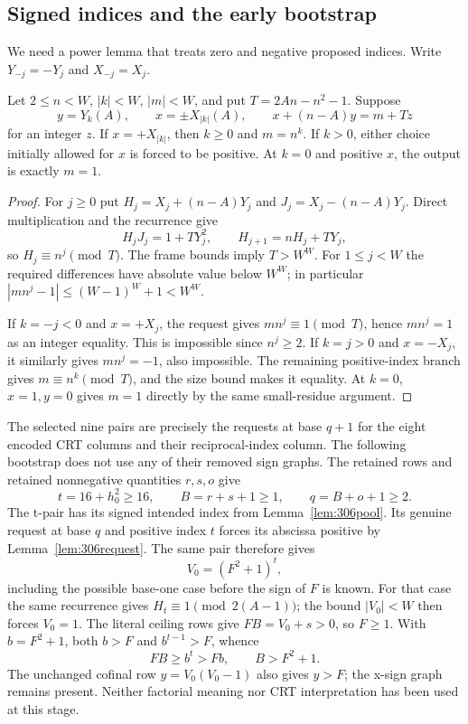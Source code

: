 \subsection{Signed indices and the early bootstrap}

We need a power lemma that treats zero and negative proposed indices.
Write $Y_{-j}=-Y_j$ and $X_{-j}=X_j$.

\begin{lemma}\label{lem:306request}
Let $2\leq n<W$, $|k|<W$, $|m|<W$, and put
$T=2An-n^2-1$.  Suppose
\[
 y=Y_k(A),\qquad x=\pm X_{|k|}(A),\qquad
 x+(n-A)y=m+Tz
\]
for an integer $z$.  If $x=+X_{|k|}$, then $k\geq0$ and $m=n^k$.
If $k>0$, either choice initially allowed for $x$ is forced to be positive.
At $k=0$ and positive $x$, the output is exactly $m=1$.
\end{lemma}

\begin{proof}
For $j\geq0$ put
$H_j=X_j+(n-A)Y_j$ and $J_j=X_j-(n-A)Y_j$.  Direct multiplication and
the recurrence give
\[
 H_jJ_j=1+TY_j^2,\qquad H_{j+1}=nH_j+TY_j,
\]
so $H_j\equiv n^j\pmod T$.  The frame bounds imply $T>W^W$.  For
$1\leq j<W$ the required differences have absolute value below $W^W$;
in particular
$|mn^j-1|\leq(W-1)^W+1<W^W$.

If $k=-j<0$ and $x=+X_j$, the request gives
$mn^j\equiv1\pmod T$, hence $mn^j=1$ as an integer equality.  This is
impossible since $n^j\geq2$.  If $k=j>0$ and $x=-X_j$, it similarly gives
$mn^j=-1$, also impossible.  The remaining positive-index branch gives
$m\equiv n^k\pmod T$, and the size bound makes it equality.  At $k=0$,
$x=1,y=0$ gives $m=1$ directly by the same small-residue argument.
\end{proof}

The selected nine pairs are precisely the requests at base $q+1$ for
the eight encoded CRT columns and their reciprocal-index column.  The
following bootstrap does not use any of their removed sign graphs.
The retained rows and retained nonnegative quantities $r,s,o$ give
\[
 t=16+h_0^2\geq16,\qquad B=r+s+1\geq1,\qquad q=B+o+1\geq2.
\]
The t-pair has its signed intended index from Lemma~\ref{lem:306pool}.
Its genuine request at base $q$ and positive index $t$ forces its abscissa
positive by Lemma~\ref{lem:306request}.  The same pair therefore gives
\[
 V_0=(F^2+1)^t,
\]
including the possible base-one case before the sign of $F$ is known.
For that case the same recurrence gives $H_t\equiv1\pmod{2(A-1)}$;
the bound $|V_0|<W$ then forces $V_0=1$.
The literal ceiling rows give $FB=V_0+s>0$, so $F\geq1$.  With
$b=F^2+1$, both $b>F$ and $b^{t-1}>F$, whence
\begin{equation}\label{eq:306Bbound}
 FB\geq b^t>Fb,\qquad B>F^2+1.
\end{equation}
The unchanged cofinal row $y=V_0(V_0-1)$ also gives $y>F$; the x-sign
graph remains present.  Neither factorial meaning nor CRT interpretation
has been used at this stage.

